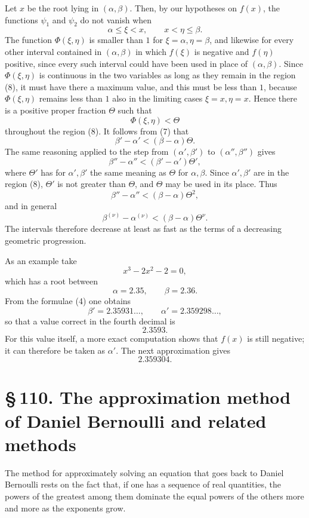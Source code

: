 \documentclass[11pt]{article}
\providecommand{\sect}[2]{\section*{\S\,#1. #2}}
\begin{document}
Let $x$ be the root lying in $(\alpha,\beta)$. Then, by our hypotheses on $f(x)$, the functions $\psi_1$ and $\psi_2$ do not vanish when
\begin{equation}
        \alpha\le \xi<x,\qquad x<\eta\le\beta.
\tag{8}
\end{equation}
The function $\Phi(\xi,\eta)$ is smaller than $1$ for $\xi=\alpha,\eta=\beta$, and likewise for every other interval contained in $(\alpha,\beta)$ in which $f(\xi)$ is negative and $f(\eta)$ positive, since every such interval could have been used in place of $(\alpha,\beta)$. Since $\Phi(\xi,\eta)$ is continuous in the two variables as long as they remain in the region (8), it must have there a maximum value, and this must be less than $1$, because $\Phi(\xi,\eta)$ remains less than $1$ also in the limiting cases $\xi=x,\eta=x$. Hence there is a positive proper fraction $\Theta$ such that
\[
        \Phi(\xi,\eta)<\Theta
\]
throughout the region (8). It follows from (7) that
\[
        \beta'-\alpha'<(\beta-\alpha)\Theta.
\]
The same reasoning applied to the step from $(\alpha',\beta')$ to $(\alpha'',\beta'')$ gives
\[
        \beta''-\alpha''<(\beta'-\alpha')\Theta',
\]
where $\Theta'$ has for $\alpha',\beta'$ the same meaning as $\Theta$ for $\alpha,\beta$. Since $\alpha',\beta'$ are in the region (8), $\Theta'$ is not greater than $\Theta$, and $\Theta$ may be used in its place. Thus
\[
        \beta''-\alpha''<(\beta-\alpha)\Theta^2,
\]
and in general
\[
        \beta^{(\nu)}-\alpha^{(\nu)}<(\beta-\alpha)\Theta^\nu.
\]
The intervals therefore decrease at least as fast as the terms of a decreasing geometric progression.

As an example take
\[
        x^3-2x^2-2=0,
\]
which has a root between
\[
        \alpha=2.35,\qquad \beta=2.36.
\]
From the formulae (4) one obtains
\[
        \beta'=2.35931\ldots,\qquad
        \alpha'=2.359298\ldots,
\]
so that a value correct in the fourth decimal is
\[
        2.3593.
\]
For this value itself, a more exact computation shows that $f(x)$ is still negative; it can therefore be taken as $\alpha'$. The next approximation gives
\[
        2.359304.
\]

\sect{110}{The approximation method of Daniel Bernoulli and related methods}

The method for approximately solving an equation that goes back to Daniel Bernoulli rests on the fact that, if one has a sequence of real quantities, the powers of the greatest among them dominate the equal powers of the others more and more as the exponents grow.
\end{document}

